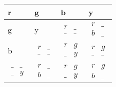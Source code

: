 \documentclass[a4paper]{article}
\begin{document}
\begin{tabular}{|l|l|l|l|}
\hline
r & g & b & y \\ \hline
g & y & $\begin{matrix}   r & \_ \\   \_ & \_  \end{matrix}$ & $\begin{matrix}   r & \_ \\   b & \_  \end{matrix}$ \\ \hline
b & $\begin{matrix}   r & \_ \\   \_ & \_  \end{matrix}$ & $\begin{matrix}   r & g \\   \_ & y  \end{matrix}$ & $\begin{matrix}   r & g \\   \_ & \_  \end{matrix}$ \\ \hline
$\begin{matrix}   \_ & \_ \\   \_ & y  \end{matrix}$ & $\begin{matrix}   r & \_ \\   b & \_  \end{matrix}$ & $\begin{matrix}   r & g \\   \_ & y  \end{matrix}$ & $\begin{matrix}   r & g \\   b & \_  \end{matrix}$ \\ \hline
\end{tabular}\\\\
\end{document}
